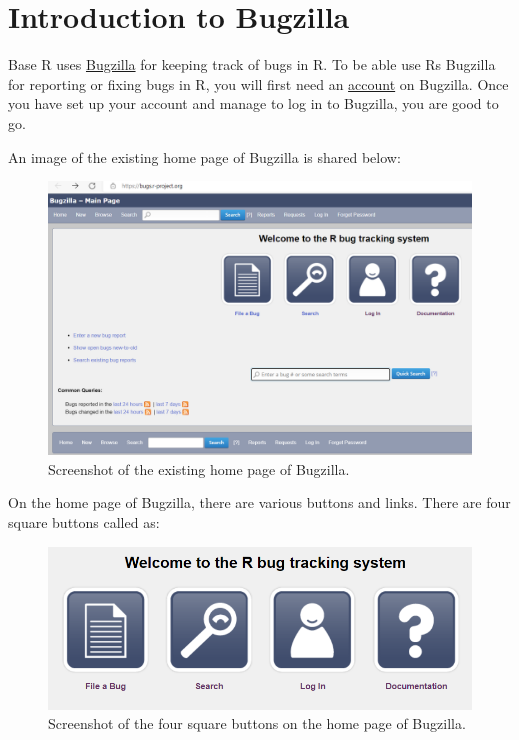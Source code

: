 \documentclass[
]{book}
\begin{document}
\hypertarget{introduction-to-bugzilla}{%
\section{Introduction to Bugzilla}\label{introduction-to-bugzilla}}

Base R uses \href{https://bugs.r-project.org/}{Bugzilla} for keeping track of bugs in R. To be able use R\textquotesingle s Bugzilla for reporting or fixing bugs in R, you will first need an \protect\hyperlink{RCorePkgBug}{account} on Bugzilla. Once you have set up your account and manage to log in to Bugzilla, you are good to go.

An image of the existing home page of Bugzilla is shared below:

\begin{figure}
\centering
\includegraphics{img/bugzilla.png}
\caption{Screenshot of the existing home page of Bugzilla.}
\end{figure}

On the home page of Bugzilla, there are various buttons and links. There are four square buttons called as:

\begin{figure}
\centering
\includegraphics{img/squarebuttons.png}
\caption{Screenshot of the four square buttons on the home page of Bugzilla.}
\end{figure}
\end{document}
